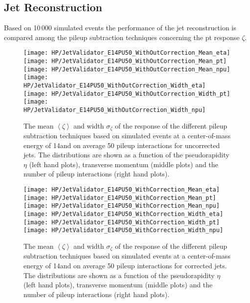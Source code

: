 \subsection{Jet Reconstruction \label{sec:HPUAppE14PU50JR}}

Based on 10\,000 simulated \ttbar events the performance of the jet reconstruction is compared among the pileup subtraction techniques concerning the pt response $\zeta$.

\begin{figure}[!h]
  \centering
  \texttt{[image: HP/JetValidator\_E14PU50\_WithOutCorrection\_Mean\_eta]}
  \texttt{[image: HP/JetValidator\_E14PU50\_WithOutCorrection\_Mean\_pt]}
  \texttt{[image: HP/JetValidator\_E14PU50\_WithOutCorrection\_Mean\_npu]}
  \\
  \centering
  \texttt{[image: HP/JetValidator\_E14PU50\_WithOutCorrection\_Width\_eta]}
  \texttt{[image: HP/JetValidator\_E14PU50\_WithOutCorrection\_Width\_pt]}
  \texttt{[image: HP/JetValidator\_E14PU50\_WithOutCorrection\_Width\_npu]}
  \caption[Mean and width of the \pt{} response of different pileup subtraction techniques based on simulated \ttbar events with 14\TeV and $\left<PU\right>=50$ for uncorrected jets]{The mean $\left<\zeta\right>$ and width $\sigma_{\zeta}$ of the \pt{} response of the  different pileup subtraction techniques based on simulated \ttbar events at a center-of-mass energy of 14\TeV and on average 50 pileup interactions for uncorrected jets. The distributions are shown as a function of the pseudorapidity $\eta$ (left hand plots), transverse momentum (middle plots) and the number of pileup interactions (right hand plots).}
\end{figure}

\begin{figure}[!h]
  \centering
  \texttt{[image: HP/JetValidator\_E14PU50\_WithCorrection\_Mean\_eta]}
  \texttt{[image: HP/JetValidator\_E14PU50\_WithCorrection\_Mean\_pt]}
  \texttt{[image: HP/JetValidator\_E14PU50\_WithCorrection\_Mean\_npu]}
  \\
  \centering
  \texttt{[image: HP/JetValidator\_E14PU50\_WithCorrection\_Width\_eta]}
  \texttt{[image: HP/JetValidator\_E14PU50\_WithCorrection\_Width\_pt]}
  \texttt{[image: HP/JetValidator\_E14PU50\_WithCorrection\_Width\_npu]}
  \caption[Mean and width of the \pt{} response of different pileup subtraction techniques based on simulated \ttbar events with 14\TeV and $\left<PU\right>=50$ for corrected jets]{The mean $\left<\zeta\right>$ and width $\sigma_{\zeta}$ of the \pt{} response of the different pileup subtraction techniques based on simulated \ttbar events at a center-of-mass energy of 14\TeV and on average 50 pileup interactions for corrected jets. The distributions are shown as a function of the pseudorapidity $\eta$ (left hand plots), transverse momentum (middle plots) and the number of pileup interactions (right hand plots).}
\end{figure}
\clearpage

